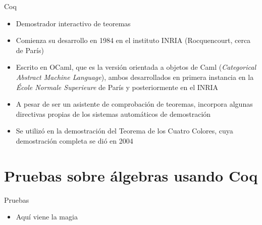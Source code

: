 \documentclass[10pt]{beamer}
\begin{document}
\begin{frame}[fragile]{Coq}

  \begin{itemize}
  \item Demostrador interactivo de teoremas
  \item Comienza su desarrollo en 1984 en el instituto INRIA
    (Rocquencourt, cerca de París)
  \item Escrito en OCaml, que es la versión orientada a objetos de
    Caml (\textit{Categorical Abstract Machine Language}), ambos
    desarrollados en primera instancia en la \textit{École Normale
      Superieure} de París y posteriormente en el INRIA
  \item A pesar de ser un asistente de comprobación de teoremas,
    incorpora algunas directivas propias de los sistemas automáticos
    de demostración
  \item Se utilizó en la demostración del Teorema de los Cuatro Colores,
    cuya demostración completa se dió en 2004
  \end{itemize}

\end{frame}

\section{Pruebas sobre álgebras usando Coq}

\begin{frame}[fragile]{Pruebas}

  \begin{itemize}
  \item Aquí viene la magia
  \end{itemize}

\end{frame}
\end{document}
